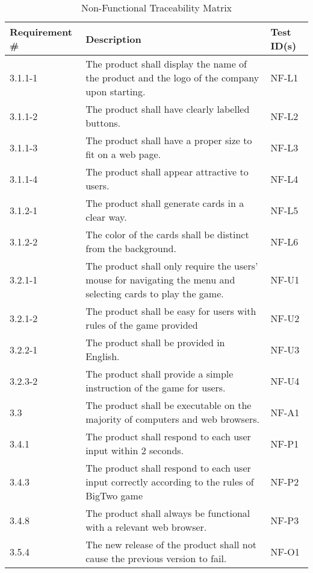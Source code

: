 \documentclass[12pt, titlepage]{article}
\begin{document}
\begin{table}[h!]
\centering
\caption{Non-Functional Traceability Matrix}
\label{table:1}
\begin{tabular}{|p{2.5cm} p{10cm} p{2.5cm}|} 
 \hline
 Requirement \# & Description & Test ID(s) \\ 
 \hline
 3.1.1-1 & The product shall display the name of the product and the logo of the company upon starting. & NF-L1 \\ 
 3.1.1-2 & The product shall have clearly labelled buttons. & NF-L2 \\ 
 3.1.1-3 & The product shall have a proper size to fit on a web page. & NF-L3 \\ 
 3.1.1-4 & The product shall appear attractive to users. & NF-L4 \\ 
 3.1.2-1 & The product shall generate cards in a clear way. & NF-L5 \\  
 3.1.2-2 & The color of the cards shall be distinct from the background. & NF-L6 \\
 3.2.1-1 & The product shall only require the users’ mouse for navigating the menu and selecting cards to play the game. & NF-U1 \\
 3.2.1-2 & The product shall be easy for users with rules of the game provided & NF-U2 \\
 3.2.2-1 & The product shall be provided in English. & NF-U3 \\
 3.2.3-2 & The product shall provide a simple instruction of the game for users. & NF-U4 \\
 3.3 & The product shall be executable on the majority of computers and web browsers. & NF-A1 \\
 3.4.1 & The product shall respond to each user input within 2 seconds. & NF-P1 \\
 3.4.3 & The product shall respond to each user input correctly according to the rules of BigTwo game & NF-P2 \\
 3.4.8 & The product shall always be functional with a relevant web browser. & NF-P3 \\
 3.5.4 & The new release of the product shall not cause the previous version to fail. & NF-O1 \\
 \hline
\end{tabular}
\end{table}

\newpage
\end{document}
